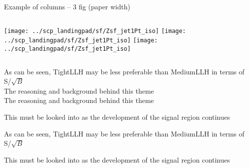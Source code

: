 \documentclass{beamer}
\begin{document}
		
		
	
\begin{frame}{Example of columns -- 3 fig (paper width)}

	\begin{block}{}  %
		\begin{columns}[c]
			\column{0.33\paperwidth}
				\centering
				\texttt{[image: ../scp\_landingpad/sf/Zsf\_jet1Pt\_iso]}
			\column{0.33\paperwidth}
				\centering
				\texttt{[image: ../scp\_landingpad/sf/Zsf\_jet1Pt\_iso]}
			\column{0.33\paperwidth}
				\centering
				\texttt{[image: ../scp\_landingpad/sf/Zsf\_jet1Pt\_iso]}

		\end{columns}


	\end{block}
	\begin{block}{} %
		\begin{itemize}
			{\footnotesize
			\item As can be seen, TightLLH may be less preferable than MediumLLH in terms of S/$\sqrt{B}$  \\ \textcolor{ExecusharesGrey}{\tiny\hspace{1em} The reasoning and background behind this theme}  \\ \textcolor{ExecusharesGrey}{\tiny\hspace{1em} The reasoning and background behind this theme}
			\item This must be looked into as the development of the signal region continues
			\item As can be seen, TightLLH may be less preferable than MediumLLH in terms of S/$\sqrt{B}$
			\item This must be looked into as the development of the signal region continues
		}
		\end{itemize}
	\end{block}
		\end{frame}
		
\end{document}
